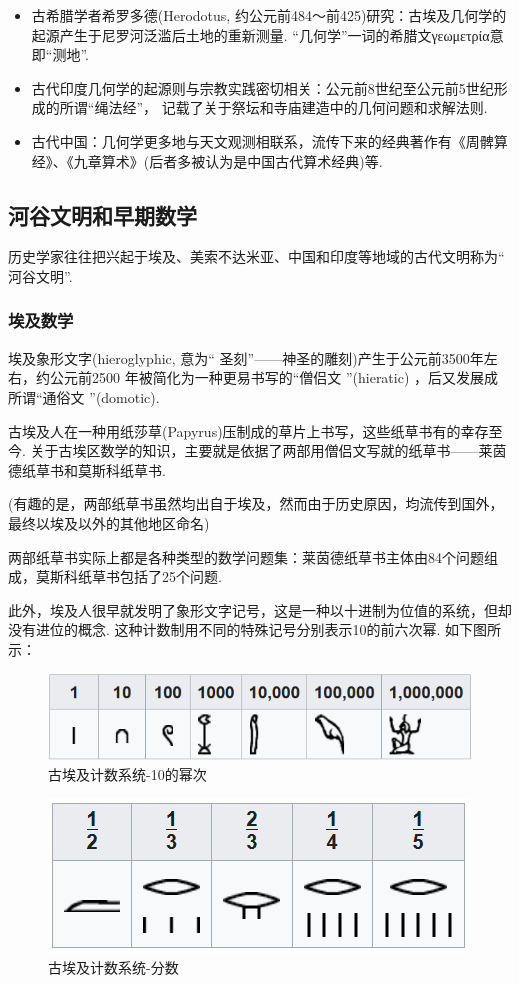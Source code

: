 \documentclass{Math_Note}
\begin{document}
\begin{itemize}
    \item 古希腊学者希罗多德(Herodotus, 约公元前484～前425)研究：古埃及几何学的起源产生于尼罗河泛滥后土地的重新测量. 
    “几何学”一词的希腊文γεωμετρία意即“测地”.
    \item 古代印度几何学的起源则与宗教实践密切相关：公元前8世纪至公元前5世纪形成的所谓“绳法经”，
    记载了关于祭坛和寺庙建造中的几何问题和求解法则.
    \item 古代中国：几何学更多地与天文观测相联系，流传下来的经典著作有《周髀算经》、《九章算术》(后者多被认为是中国古代算术经典)等.
\end{itemize}

\subsection{河谷文明和早期数学}
历史学家往往把兴起于埃及、美索不达米亚、中国和印度等地域的古代文明称为“ 河谷文明”.
\subsubsection{埃及数学}
埃及象形文字(hieroglyphic, 意为“ 圣刻”——神圣的雕刻)产生于公元前3500年左右，约公元前2500 年被简化为一种更易书写的“僧侣文 ”(hieratic) ，后又发展成所谓“通俗文 ”(domotic).

古埃及人在一种用纸莎草(Papyrus)压制成的草片上书写，这些纸草书有的幸存至今. 关于古埃区数学的知识，主要就是依据了两部用僧侣文写就的纸草书——莱茵德纸草书和莫斯科纸草书. 

(有趣的是，两部纸草书虽然均出自于埃及，然而由于历史原因，均流传到国外，最终以埃及以外的其他地区命名)

两部纸草书实际上都是各种类型的数学问题集：莱茵德纸草书主体由84个问题组成，莫斯科纸草书包括了25个问题.

此外，埃及人很早就发明了象形文字记号，这是一种以十进制为位值的系统，但却没有进位的概念. 这种计数制用不同的特殊记号分别表示10的前六次幂. 如下图所示：

\begin{figure}[H]
    \centering
    \includegraphics[scale=0.8]{"./Figures/Ancient_Egyptian_Math_1.png"} %
    \caption{古埃及计数系统-10的幂次}
\end{figure}
\begin{figure}[H]
    \centering
    \includegraphics[scale=0.8]{"./Figures/Ancient_Egyptian_Math_2.png"}
    \caption{古埃及计数系统-分数}
\end{figure}
\end{document}
